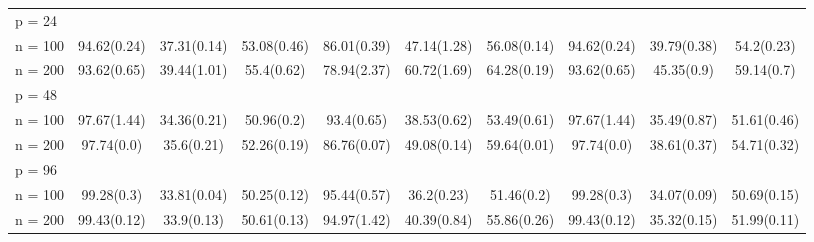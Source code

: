 \begin{table}[p]
{\begin{tabular}{l@{\hskip 0.4in} ccc ccc ccc}
 p = 24 & & & & & & & & & \\
\multicolumn{1}{r}{n = 100}&94.62(0.24)&37.31(0.14)&53.08(0.46)&86.01(0.39)&47.14(1.28)&56.08(0.14)&94.62(0.24)&39.79(0.38)&54.2(0.23)\\
\multicolumn{1}{r}{n = 200}&93.62(0.65)&39.44(1.01)&55.4(0.62)&78.94(2.37)&60.72(1.69)&64.28(0.19)&93.62(0.65)&45.35(0.9)&59.14(0.7)\\
 p = 48 & & & & & & & & & \\
\multicolumn{1}{r}{n = 100}&97.67(1.44)&34.36(0.21)&50.96(0.2)&93.4(0.65)&38.53(0.62)&53.49(0.61)&97.67(1.44)&35.49(0.87)&51.61(0.46)\\
\multicolumn{1}{r}{n = 200}&97.74(0.0)&35.6(0.21)&52.26(0.19)&86.76(0.07)&49.08(0.14)&59.64(0.01)&97.74(0.0)&38.61(0.37)&54.71(0.32)\\
 p = 96 & & & & & & & & & \\
\multicolumn{1}{r}{n = 100}&99.28(0.3)&33.81(0.04)&50.25(0.12)&95.44(0.57)&36.2(0.23)&51.46(0.2)&99.28(0.3)&34.07(0.09)&50.69(0.15)\\
\multicolumn{1}{r}{n = 200}&99.43(0.12)&33.9(0.13)&50.61(0.13)&94.97(1.42)&40.39(0.84)&55.86(0.26)&99.43(0.12)&35.32(0.15)&51.99(0.11)\\
\end{tabular}}
\label{table:precision-homogeneous}
\end{table}
